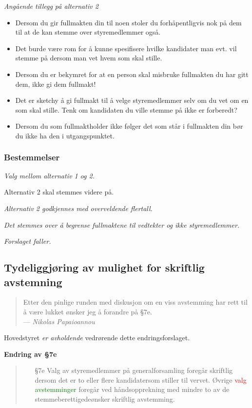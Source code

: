 \documentclass[10pt,norsk,a4paper]{article}
\begin{document}
\emph{Angående tillegg på alternativ 2}
\begin{itemize}
	\item Dersom du gir fullmakten din til noen stoler du forhåpentligvis nok på dem til at de kan stemme over styremedlemmer også.
	\item Det burde være rom for å kunne spesifisere hvilke kandidater man evt. vil stemme på dersom man vet hvem som skal stille. 
	\item Dersom du er bekymret for at en person skal misbruke fullmakten du har gitt dem, ikke gi dem fullmakt!
	\item Det er sketchy å gi fullmakt til å velge styremedlemmer selv om du vet om en som skal stille. Tenk om kandidaten du ville stemme på ikke er forberedt?
	\item Dersom du som fullmaktholder ikke følger det som står i fullmakten din bør du ikke ha den i utgangspunktet.
\end{itemize}
	
\subsubsection{Bestemmelser}
\emph{Valg mellom alternativ 1 og 2.}

Alternativ 2 skal stemmes videre på.

\textit{Alternativ 2 godkjennes med overveldende flertall.}

\emph{Det stemmes over å begrense fullmaktene til vedtekter og ikke styremedlemmer.}

\textit{Forslaget faller.}

\newpage

\subsection{Tydeliggjøring av mulighet for skriftlig avstemning}%
\label{sec:avstemning}

\begin{quote}
	Etter den pinlige runden med diskusjon om en viss avstemming har rett til å være lukket ønsker jeg å forandre på §7e. \\
	--- \emph{Nikolas Papaioannou}
\end{quote}

Hovedstyret \emph{er avholdende} vedrørende dette endringsforslaget.

\textbf{Endring av §7e}
\begin{quote}
    \begin{enumerate}
        \item[§7e]
        Valg av styremedlemmer på generalforsamling foregår skriftlig dersom
        det er to eller flere kandidatersom stiller til vervet. Øvrige
        \textcolor{red}{valg} \textcolor{green}{avstemminger} foregår ved håndsopprekning med mindre
        to av de stemmeberettigedeønsker skriftlig avstemming.
    \end{enumerate}
\end{quote}
\end{document}
